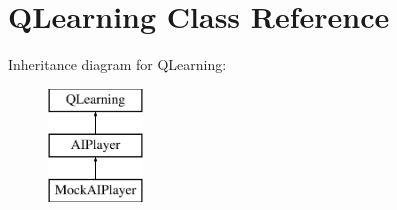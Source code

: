 \hypertarget{classQLearning}{}\section{Q\+Learning Class Reference}
\label{classQLearning}
Inheritance diagram for Q\+Learning\+:\begin{figure}[H]
\begin{center}
\leavevmode
\includegraphics[height=3.000000cm]{classQLearning}
\end{center}
\end{figure}
